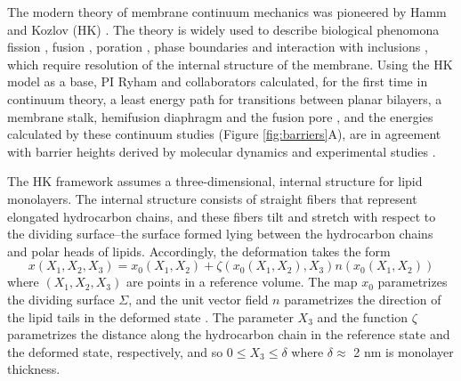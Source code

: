 The modern theory of membrane continuum mechanics
was pioneered by Hamm and Kozlov (HK) \cite{HaKo2000}.
The theory is widely used to describe biological phenomona 
fission \cite{10.1016/j.chemphyslip.2014.07.006, 10.1038/nature14509, 10.1103/PhysRevE.79.031926},
fusion \cite{10.1016/S0006-3495(02)75450-7,10.1073/pnas.121191898,10.1073/pnas.1119442109} ,
poration \cite{10.1016/j.bpj.2019.11.2221}, phase boundaries and interaction with inclusions
\cite{https://doi.org/10.1038/nrm.2017.16,10.1016/j.bpj.2019.11.2209, https://doi.org/10.1038/s41598-020-61110-2}, which require resolution of the internal structure of the membrane.  
Using the HK  model as a base,
PI Ryham and collaborators calculated, for the first time in continuum theory, a least energy path for transitions between planar bilayers, a membrane stalk,
hemifusion diaphragm and the fusion pore \cite{RyWaCo13, RyKlYaCo16},
and the energies calculated by these continuum studies (Figure \ref{fig:barriers}A),
are in agreement with barrier heights derived by molecular dynamics and experimental studies \cite{FrRoPi17}.  

The HK framework assumes a three-dimensional, internal structure for lipid monolayers.
The internal structure consists of straight fibers that represent elongated hydrocarbon chains, and these fibers
tilt and stretch with respect to the dividing surface--the surface formed lying between the hydrocarbon chains and polar heads of lipids.
Accordingly, the deformation takes the form 
\begin{equation}
  \label{LMdeformation}
x(X_1, X_2, X_3) = x_0(X_1, X_2) + \zeta(x_0(X_1, X_2), X_3) n(x_0(X_1, X_2))
\end{equation}
where $(X_1,X_2,X_3)$ are points in a reference volume.
The map $x_0$ parametrizes the dividing surface $\Sigma$, and the unit vector field $n$ parametrizes the
direction of the lipid tails in the deformed state \cite{doi:10.1021/jp075641w,KLAUDA20083074}.
The parameter $X_3$ and the function $\zeta$ parametrizes the distance along the hydrocarbon chain in the reference state
and the deformed state, respectively, and so $0 \leq X_3 \leq \delta$ where $\delta \approx $ 2 nm is monolayer thickness. 

